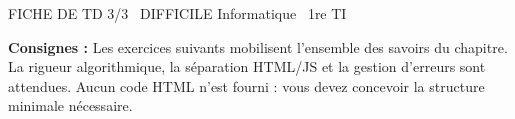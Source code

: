 \documentclass[11pt]{article}
\begin{document}
\begin{tcolorbox}[enhanced,colback=popink,colframe=popink,arc=10pt,boxrule=0pt,left=12pt,right=12pt,top=9pt,bottom=9pt]
{\color{white}\popxbold\small FICHE DE TD 3/3 \textbullet\ DIFFICILE \hfill Informatique \textbullet\ 1re TI\par}
\end{tcolorbox}
\vspace{4pt}
\noindent \textbf{Consignes :} Les exercices suivants mobilisent l'ensemble des savoirs du chapitre. La rigueur algorithmique, la séparation HTML/JS et la gestion d'erreurs sont attendues. Aucun code HTML n'est fourni : vous devez concevoir la structure minimale nécessaire.
\end{document}
